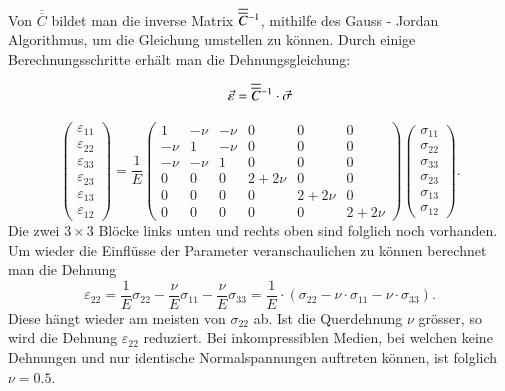 Von  $\overline{\overline{C}}$ bildet man die inverse Matrix $\overline{\overline{C}}\mathstrut^{-1}$, mithilfe des Gauss - Jordan Algorithmus, um die Gleichung umstellen zu können.
Durch einige Berechnungsschritte erhält man die Dehnungsgleichung:

\[
\vec{\varepsilon}
=
\overline{\overline{C}}\mathstrut^{-1}\cdot \vec{\sigma}
\]

\[
\begin{pmatrix}
	\varepsilon_{11}\\
	\varepsilon_{22}\\
	\varepsilon_{33}\\
	\varepsilon_{23}\\
	\varepsilon_{13}\\
	\varepsilon_{12}
\end{pmatrix}
=
\frac{1}{E}
\begin{pmatrix}
	   1 & -\nu & -\nu & 0      & 0      & 0     \\
	-\nu &    1 & -\nu & 0      & 0      & 0     \\
	-\nu & -\nu &    1 & 0      & 0      & 0     \\
 	   0 &    0 &    0 & 2+2\nu & 0      & 0     \\
	   0 &    0 &    0 &      0 & 2+2\nu & 0     \\
	   0 &    0 &    0 &      0 & 0      & 2+2\nu
\end{pmatrix}
\begin{pmatrix}
	\sigma_{11}\\
	\sigma_{22}\\
	\sigma_{33}\\
	\sigma_{23}\\
	\sigma_{13}\\
	\sigma_{12}
\end{pmatrix}
.
\]
Die zwei $3\times3$ Blöcke links unten und rechts oben sind folglich noch vorhanden.
Um wieder die Einflüsse der Parameter veranschaulichen zu können berechnet man die Dehnung
\[
\varepsilon_{22}
=
\frac{1}{E}\sigma_{22} - \frac{\nu}{E}\sigma_{11} - \frac{\nu}{E}\sigma_{33}
=
\frac{1}{E}\cdot(\sigma_{22}-\nu\cdot\sigma_{11}-\nu\cdot\sigma_{33})
.
\]
Diese hängt wieder am meisten von $\sigma_{22}$ ab.
Ist die Querdehnung $\nu$ grösser, so wird die Dehnung $\varepsilon_{22}$ reduziert.
Bei inkompressiblen Medien, bei welchen keine Dehnungen und nur identische Normalspannungen auftreten können, ist folglich $\nu=0.5$.

